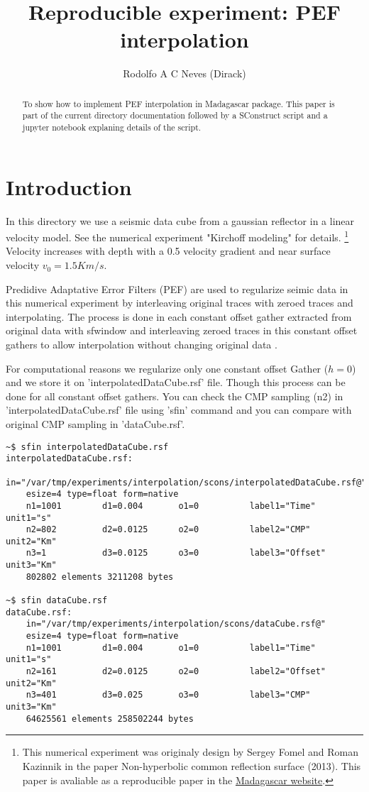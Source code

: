 \title{Reproducible experiment: PEF interpolation}

\author{Rodolfo A C Neves (Dirack)}
\begin{abstract}
To show how to implement PEF interpolation in Madagascar
package. This paper is part of the current directory 
documentation followed by a SConstruct script and a jupyter
notebook explaning details of the script.
\end{abstract}

\section{Introduction}


\indent In this directory we use a seismic data cube from a gaussian reflector in a linear velocity model. See the numerical experiment "Kirchoff modeling" for details.
\footnote{This numerical experiment was originaly 
design by Sergey Fomel and Roman Kazinnik in 
the paper Non-hyperbolic common reflection surface
(2013). 
This paper is avaliable as a reproducible paper in
the \href{http://www.ahay.org}{Madagascar website}.}
Velocity increases with depth with a 0.5 
velocity gradient and near surface velocity 
$v_0=1.5Km/s$.

\indent Predidive Adaptative Error Filters (PEF) are used to regularize seimic data in this numerical
experiment by interleaving original traces with zeroed traces and interpolating.
The process is done in each constant offset gather extracted from original data with
sfwindow and interleaving zeroed traces in this constant offset gathers to allow interpolation without
changing original data \cite[]{liu}.

\indent For computational reasons we regularize only one constant offset Gather ($h=0$)
and we store it on 'interpolatedDataCube.rsf' file.
Though this process can be done for all constant offset gathers.
You can check the CMP sampling (n2) in 'interpolatedDataCube.rsf'
file using 'sfin' command and you can compare with original CMP sampling in 'dataCube.rsf'.

\begin{verbatim}
~$ sfin interpolatedDataCube.rsf 
interpolatedDataCube.rsf:
    in="/var/tmp/experiments/interpolation/scons/interpolatedDataCube.rsf@"
    esize=4 type=float form=native 
    n1=1001        d1=0.004       o1=0          label1="Time" unit1="s" 
    n2=802         d2=0.0125      o2=0          label2="CMP" unit2="Km" 
    n3=1           d3=0.0125      o3=0          label3="Offset" unit3="Km" 
	802802 elements 3211208 bytes

~$ sfin dataCube.rsf 
dataCube.rsf:
    in="/var/tmp/experiments/interpolation/scons/dataCube.rsf@"
    esize=4 type=float form=native 
    n1=1001        d1=0.004       o1=0          label1="Time" unit1="s" 
    n2=161         d2=0.0125      o2=0          label2="Offset" unit2="Km" 
    n3=401         d3=0.025       o3=0          label3="CMP" unit3="Km" 
	64625561 elements 258502244 bytes
\end{verbatim}


